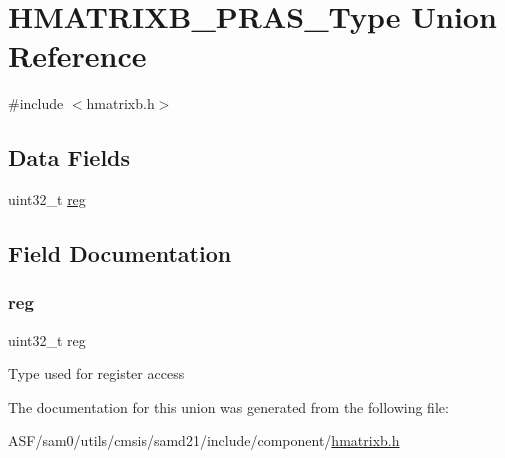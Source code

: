 \hypertarget{union_h_m_a_t_r_i_x_b___p_r_a_s___type}{}\section{H\+M\+A\+T\+R\+I\+X\+B\+\_\+\+P\+R\+A\+S\+\_\+\+Type Union Reference}
\label{union_h_m_a_t_r_i_x_b___p_r_a_s___type}


{\ttfamily \#include $<$hmatrixb.\+h$>$}

\subsection*{Data Fields}
\begin{DoxyCompactItemize}
\item 
uint32\+\_\+t \mbox{\hyperlink{union_h_m_a_t_r_i_x_b___p_r_a_s___type_a6b91636401516a477989a336376d7b40}{reg}}
\end{DoxyCompactItemize}


\subsection{Field Documentation}
\mbox{\label{union_h_m_a_t_r_i_x_b___p_r_a_s___type_a6b91636401516a477989a336376d7b40}} 
\subsubsection{\texorpdfstring{reg}{reg}}
{\footnotesize\ttfamily uint32\+\_\+t reg}

Type used for register access 

The documentation for this union was generated from the following file\+:\begin{DoxyCompactItemize}
\item 
A\+S\+F/sam0/utils/cmsis/samd21/include/component/\mbox{\hyperlink{hmatrixb_8h}{hmatrixb.\+h}}\end{DoxyCompactItemize}
